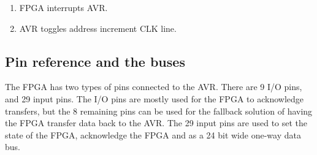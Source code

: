 \begin{enumerate}
\item FPGA interrupts AVR. 
\item AVR toggles address increment CLK line. 
\end{enumerate}


\subsection {Pin reference and the buses}
The FPGA has two types of pins connected to the AVR. There are 9 I/O pins, and 29 input pins. The I/O pins are mostly used for the FPGA to acknowledge transfers, but the 8 remaining pins can be used for the fallback solution of having the FPGA transfer data back to the AVR. The 29 input pins are used to set the state of the FPGA, acknowledge the FPGA and as a 24 bit wide one-way data bus.

